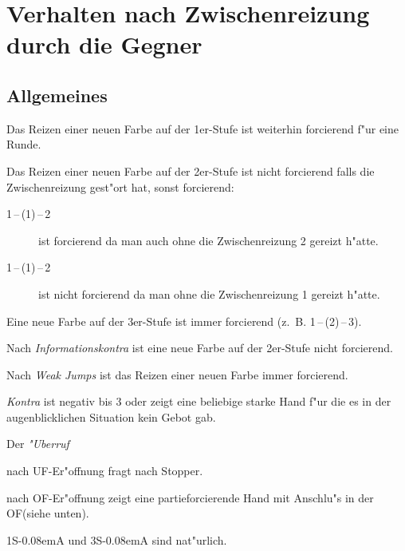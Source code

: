 \documentclass[11pt,german,twocolumn]{scrartcl}
\def\pik{\nobreak\hspace{\cardskip}\Sp\xspace}
\def\coe{\nobreak\hspace{\cardskip}\He\xspace}
\def\kar{\nobreak\hspace{\cardskip}\Di\xspace}
\def\tre{\nobreak\hspace{\cardskip}\Cl\xspace}
\def\ufa{\nobreak\textsf{UF}\xspace}
\def\ofa{\nobreak\textsf{OF}\xspace}
\def\sa{\nobreak\textsf{S\kern-0.08emA}\xspace}
\def\SA{\nobreak\hspace{\cardskip}\sa}
\def\sep{\,--\,}
\newcommand{\conv}[1]{\emph{#1}}
\begin{document}
\newpage
\section{Verhalten nach Zwischenreizung durch die
  Gegner\label{zwischenreizung}}

\subsection{Allgemeines}
\begin{compactitem}
\item Das Reizen einer neuen Farbe auf der 1er-Stufe ist weiterhin
forcierend f"ur eine Runde.
%
\item Das Reizen einer neuen Farbe auf der 2er-Stufe ist nicht forcierend
falls die Zwischenreizung gest"ort hat, sonst forcierend:
\begin{description}
\item[1\coe{}\sep(1\pik){}\sep2\kar] ist forcierend da man auch
ohne die Zwischenreizung 2\kar gereizt h"atte.
\item[1\tre{}\sep(1\pik){}\sep2\coe] ist nicht forcierend da man ohne die
  Zwischenreizung 1\coe gereizt h"atte.
\end{description}
%
\item Eine neue Farbe auf der 3er-Stufe ist immer forcierend
  (z.~B. 1\pik{}\sep(2\kar){}\sep3\tre).
\item Nach \conv{Informationskontra} ist eine neue Farbe auf der 2er-Stufe
  nicht forcierend.
\item Nach \conv{Weak Jumps} ist das Reizen einer neuen Farbe immer
  forcierend.
\item \conv{Kontra} ist negativ bis 3\coe oder zeigt eine beliebige
  starke Hand f"ur die es in der augenblicklichen Situation kein Gebot
  gab.
\item Der \conv{"Uberruf}
  \begin{compactitem}
    \item nach \ufa-Er"offnung fragt nach Stopper.
    \item nach \ofa-Er"offnung zeigt eine partieforcierende Hand mit
      Anschlu"s in der \ofa (siehe unten).
    \end{compactitem}
\item 1\SA und 3\SA sind nat"urlich.
\end{compactitem}
\end{document}
